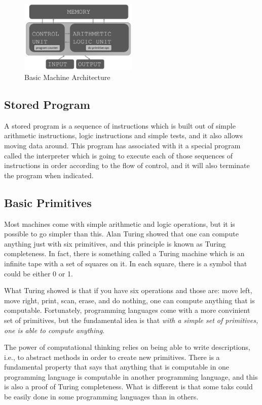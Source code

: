 \documentclass[a4paper]{article}
\begin{document}
\begin{figure}[h!]
  \centering
  \includegraphics[width=0.5\textwidth]{machine_architecture.png}
  \caption{Basic Machine Architecture}
\end{figure}

\subsection{Stored Program}

A stored program is a sequence of instructions which is built out of simple
arithmetic instructions, logic instructions and simple tests, and it also
allows moving data around. This program has associated with it a special
program called the interpreter which is going to execute each of those
sequences of instructions in order according to the flow of control, and it
will also terminate the program when indicated.

\subsection{Basic Primitives}

Most machines come with simple arithmetic and logic operations, but it is
possible to go simpler than this. Alan Turing showed that one can compute
anything just with six primitives, and this principle is known as Turing
completeness. In fact, there is something called a Turing machine which is an
infinite tape with a set of squares on it. In each square, there is a symbol
that could be either 0 or 1.

What Turing showed is that if you have six operations and those are: move left,
move right, print, scan, erase, and do nothing, one can compute anything
that is computable. Fortunately, programming languages come with a more
convinient set of primitives, but the fundamental idea is that
\textit{with a simple set of primitives, one is able to compute anything}.

The power of computational thinking relies on being able to write descriptions,
i.e., to abstract methods in order to create new primitives. There is a
fundamental property that says that anything that is computable in one
programming language is computable in another programming language, and this is
also a proof of Turing completeness. What is different is that some taks could
be easily done in some programming languages than in others.
\end{document}
